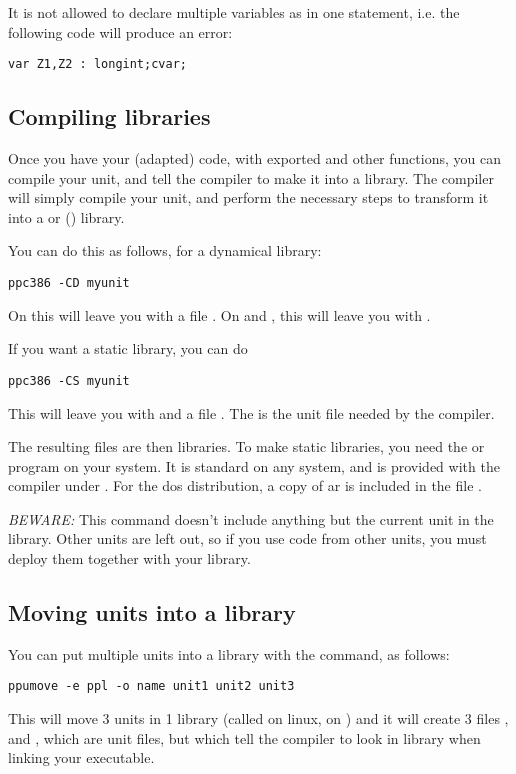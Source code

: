 \documentclass{report}
\begin{document}
It is not allowed to declare multiple variables as  in one
statement, i.e. the following code will produce an error:
\begin{verbatim}
var Z1,Z2 : longint;cvar;
\end{verbatim}

\subsection {Compiling libraries}

Once you have your (adapted) code, with exported and other functions,
you can compile your unit, and tell the compiler to make it into a library.
The compiler will simply compile your unit, and perform the necessary steps
to transform it into a  or  () library.

You can do this as follows, for a dynamical library:
\begin{verbatim}
ppc386 -CD myunit
\end{verbatim}
On \linux this will leave you with a file . On \windows
and \ostwo, this will leave you with .

If you want a static library, you can do
\begin{verbatim}
ppc386 -CS myunit
\end{verbatim}
This will leave you with  and a file .
The  is the unit file needed by the \fpc compiler.

The resulting files are then libraries. To make static libraries, you need
the  or  program on your system. It is standard on any
\linux system, and is provided with the  compiler under \dos.
For the dos distribution, a copy of ar is included in the file 
.

{\em BEWARE:} This command doesn't include anything but the current unit in
the library. Other units are left out, so if you use code from other units,
you must deploy them together with your library.

\subsection{Moving units into a library}
You can put multiple units into a library with the  command, as
follows:

\begin{verbatim}
ppumove -e ppl -o name unit1 unit2 unit3
\end{verbatim}
This will move 3 units in 1 library (called  on linux,
 on \windows) and it will create 3 files ,
 and , which are unit files, but which tell
the compiler to look in library  when linking your executable.
\end{document}
